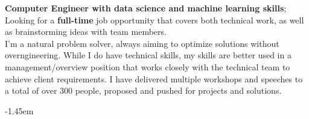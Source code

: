 \documentclass[10pt,a4paper,ragged2e]{altacv}
\begin{document}



\begin{fullwidth}
  \makecvheader

  \textbf{Computer Engineer with data science and machine learning skills}; Looking for a \textbf{full-time} job opportunity that covers both technical work, as well as brainstorming ideas with team members.\\
  I'm a natural problem solver, always aiming to optimize solutions without overngineering. While I do have technical skills, my skills are better used in a management/overview position that works closely with the technical team to achieve client requirements.
  \smallskip
  I have delivered multiple workshops and speeches to a total of over 300 people, proposed and pushed for projects and solutions.

\end{fullwidth}



{}
\kern-1.45em %


\verbose{}{} %% "strenghts" section will only appear when verbose

\end{document}
